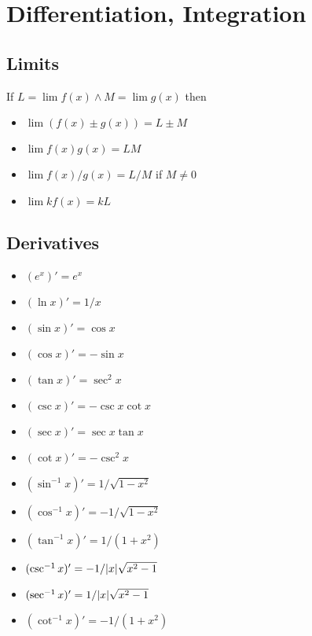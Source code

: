 \documentclass{slnotes}
\DeclarePairedDelimiter\abs{\lvert}{\rvert}%
\begin{document}
\chapter{Differentiation, Integration}
\section{Limits}
If \(L = \lim f(x) \land M = \lim g(x)\) then \begin{itemize}
\item \(\lim (f(x) \pm g(x)) = L \pm M\)
\item \(\lim f(x)g(x) = LM\)
\item \(\lim f(x)/g(x) = L/M\) if \(M \neq 0\)
\item \(\lim kf(x) = kL\)
\end{itemize}

\section{Derivatives}
\begin{itemize}
\item \((e^x)' = e^x\)
\item \((\ln x)' = 1/x\)
\item \((\sin x)' = \cos x\)
\item \((\cos x)' = -\sin x\)
\item \((\tan x)' = \sec^2 x\)
\item \((\csc x)' = -\csc x \cot x\)
\item \((\sec x)' = \sec x \tan x\)
\item \((\cot x)' = -\csc^2 x\)
\item \((\sin^{-1} x)' = 1/\sqrt{1-x^2}\)
\item \((\cos^{-1} x)' = -1/\sqrt{1-x^2}\)
\item \((\tan^{-1} x)' = 1/(1+x^2)\)
\item \((\csc^{-1} x)' = -1/\abs{x}\sqrt{x^2-1}\)
\item \((\sec^{-1} x)' = 1/\abs{x}\sqrt{x^2-1}\)
\item \((\cot^{-1} x)' = -1/(1+x^2)\)
\end{itemize}
\end{document}
